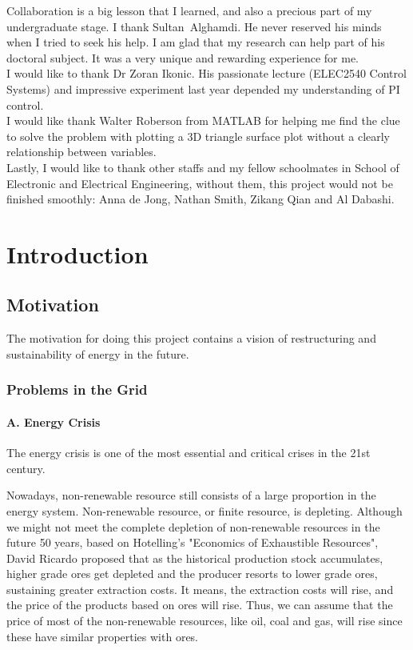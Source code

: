 \documentclass{report}
\begin{document}
Collaboration is a big lesson that I learned, and also a precious part of my undergraduate stage. I thank Sultan Alghamdi. He never reserved his minds when I tried to seek his help. I am glad that my research can help part of his doctoral subject. It was a very unique and rewarding experience for me.\\

I would like to thank Dr Zoran Ikonic. His passionate lecture (ELEC2540 Control Systems) and impressive experiment last year depended my understanding of PI control.\\

I would like thank Walter Roberson from MATLAB for helping me find the clue to solve the problem with plotting a 3D triangle surface plot without a clearly relationship between variables.\\

Lastly, I would like to thank other staffs and my fellow schoolmates in School of Electronic and Electrical Engineering, without them, this project would not be finished smoothly: Anna de Jong, Nathan Smith, Zikang Qian and Al Dabashi.\\



\afterpreface


\chapter{Introduction}
\section{Motivation} %
The motivation for doing this project contains a vision of restructuring and sustainability of energy in the future.
\subsection{Problems in the Grid}
\subsubsection{A. Energy Crisis}
The energy crisis is one of the most essential and critical crises in the 21st century.

Nowadays, non-renewable resource still consists of a large proportion in the energy system. Non-renewable resource, or finite resource, is depleting. Although we might not meet the complete depletion of non-renewable resources in the future 50 years, based on Hotelling’s "Economics of Exhaustible Resources", David Ricardo proposed that as the historical production stock accumulates, higher grade ores get depleted and the producer resorts to lower grade ores, sustaining greater extraction costs. It means, the extraction costs will rise, and the price of the products based on ores will rise. Thus, we can assume that the price of most of the non-renewable resources, like oil, coal and gas, will rise since these have similar properties with ores.\\
\end{document}
